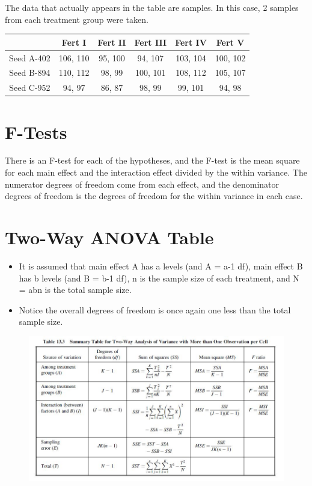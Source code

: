 \documentclass[]{article}
\begin{document}
The data that actually appears in the table are samples. In this case, 2 samples from each treatment group were taken.

\begin{tabular}{|c|c|c|c|c|c|}
	\hline  & Fert I &	Fert II	&Fert III &	Fert IV	& Fert V \\ \hline
	Seed A-402 &	106, 110 &	95, 100	& 94, 107 &	103, 104 &	100, 102 \\ \hline
	Seed B-894&	110, 112 &	98, 99&	100, 101&	108, 112&	105, 107 \\ \hline
	Seed C-952&	94, 97	& 86, 87&	98, 99&	99, 101&	94, 98 \\ \hline
\end{tabular} 


\section{F-Tests}

There is an F-test for each of the hypotheses, and the F-test is the mean square for each main effect and the interaction effect divided by the within variance. The numerator degrees of freedom come from each effect, and the denominator degrees of freedom is the degrees of freedom for the within variance in each case.

\section{Two-Way ANOVA Table}

\begin{itemize}
\item It is assumed that main effect A has a levels (and A = a-1 df), main effect B has b levels (and B = b-1 df), n is the sample size of each treatment, and N = abn is the total sample size. \item Notice the overall degrees of freedom is once again one less than the total sample size.
\end{itemize}

\begin{figure}
\centering
\includegraphics[width=1.1\linewidth]{TwoWayANOVA-Table2}
\caption{}
\label{fig:TwoWayANOVA-Table2}
\end{figure}
 
\end{document}
